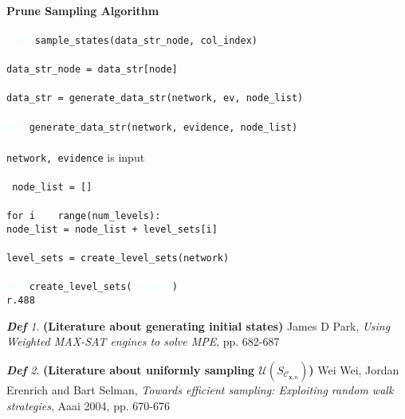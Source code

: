 \documentclass{amsart}
\newcommand\tab[1][1cm]{\hspace*{#1}}
\newcommand{\blue}[1]{\textcolor{azure}{#1}}
\newcommand{\purple}[1]{\textcolor{deepfuchsia}{#1}}
\newcommand{\blond}[1]{\textcolor{blond}{#1}}
\theoremstyle{plain}
\theoremstyle{remark}
\newtheorem*{definition*}{\textbf{\em Def}}
\theoremstyle{plain}
\newcommand{\C}{{\mathcal C}}
\newcommand{\U}{{\mathcal{U}}}
\newcommand{\bfx}{{\mathbf{x}}}
\newcommand{\vs}{\vspace{0.75pc}}
\begin{document}
\makebox[\linewidth]{\rule{\textwidth}{0.6pt}} \\
\textbf{Prune Sampling Algorithm} \\
\makebox[\linewidth]{\rule{\textwidth}{0.4pt}} \\
\texttt{
\blue{def} sample\_states(data\_str\_node, col\_index) \\ \\
data\_str\_node = data\_str[node] \\ \\
data\_str = generate\_data\_str(network, ev, node\_list) \\ \\
\blue{def} generate\_data\_str(network, evidence, node\_list)\\ \\
network, evidence} is input \\ \\
\texttt{
node\_list = [] \\ \\
\purple{for} i \blue{in} \blond{range}(num\_levels):\\
\tab node\_list = node\_list + level\_sets[i] \\ \\ 
level\_sets = create\_level\_sets(network) \\ \\
\blue{def} \blond{create\_level\_sets}(\blue{network}) \\
r.488
}



\newpage



\begin{definition*}\textbf{ (Literature about generating initial states) } \newline
[18] James D Park, \textit{Using Weighted MAX-SAT engines to solve MPE}, pp. 682-687
\end{definition*}\vs 

\begin{definition*}\textbf{ (Literature about uniformly sampling $\U(S_{\C_{\bfx,n}})
$) } \newline
[28] Wei Wei, Jordan Erenrich and Bart Selman, \textit{Towards efficient sampling: Exploiting random walk strategies}, Aaai 2004, pp. 670-676
\end{definition*}\vs 
\end{document}
